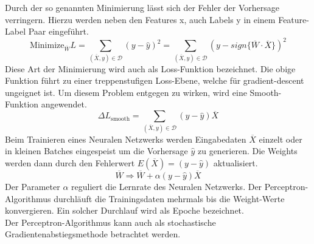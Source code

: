 \noindent 
Durch der so genannten Minimierung lässt sich der Fehler der Vorhersage verringern. Hierzu werden neben den Features x, auch Labels y in einem Feature-Label Paar eingeführt. 
$$\text{Minimize}_{\overline{W}}L = \sum\limits_{(\overline{X},y)\in \mathcal{D}}(y - \hat{y})^2 = \sum\limits_{(\overline{X},y)\in \mathcal{D}}(y - sign\{\overline{W} \cdot \overline{X}\})^2$$
Diese Art der Minimierung wird auch als Loss-Funktion bezeichnet. Die obige Funktion führt zu einer treppenstufigen Loss-Ebene, welche für gradient-descent ungeignet ist. Um diesem Problem entgegen zu wirken, wird eine Smooth-Funktion angewendet.
$$\Delta L_{\text{smooth}} = \sum\limits_{(\overline{X},y)\in \mathcal{D}}(y - \hat{y})\overline{X}$$
Beim Trainieren eines Neuralen Netzwerks werden Eingabedaten $\overline{X}$ einzelt oder in kleinen Batches eingespeist um die Vorhersage $\hat{y}$ zu generieren. Die Weights werden dann durch den Fehlerwert $E(\overline{X}) = (y - \hat{y})$ aktualisiert.
$$\overline{W} \Rightarrow \overline{W} + \alpha(y - \hat{y})\overline{X}$$
Der Parameter $\alpha$ reguliert die Lernrate des Neuralen Netzwerks. Der Perceptron-Algorithmus durchläuft die Trainingsdaten mehrmals bis die Weight-Werte konvergieren. Ein solcher Durchlauf wird als Epoche bezeichnet.\\
Der Perceptron-Algorithmus kann auch als stochastische Gradientenabstiegsmethode betrachtet werden. \cite{CA18}